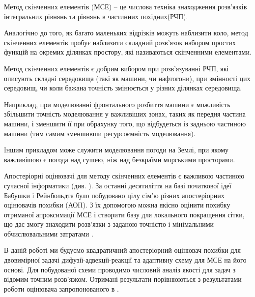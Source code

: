 

Метод скінченних елементів (МСЕ) -- це числова техніка знаходження розв'язків інтегральних рівнянь та рівнянь в частинних похідних(РЧП).

Аналогічно до того, як багато маленьких відрізків можуть наблизити коло, метод скінченних елементів пробує наблизити складний розв'язок набором простих функцій на окремих ділянках простору, які називаються скінченними елементами.

Метод скінченних елементів є добрим вибором при розв'язуванні РЧП, які описують складні середовища (такі як машини, чи нафтогони), при змінності цих середовищ, чи коли бажана точність змінюється у різних ділянках середовища.

Наприклад, при моделюванні фронтального розбиття машини є можливість збільшити точність моделювання у важливіших зонах, таких як передня частина машини, і зменшити її при обрахунку того, що відбудеться із задньою частиною машини (тим самим зменшивши ресурсоємність моделювання).

Іншим прикладом може служити моделювання погоди на Землі, при якому важливішою є погода над сушею, ніж над безкраїми морськими просторами.

Апостеріорні оцінювачі для методу скінченних елементів є важливою частиною сучасної інформатики (див. \cite{verfurth1996review, verfurth1994posteriori,eriksson1995introduction,ainsworth2011posteriori}). За останні десятиліття на базі початкової ідеї Бабушки і Рейнбольдта \cite{babuvska1978posteriori} було побудовано цілу сім'ю різних апостеріорних оцінювачів похибки (АОП). З їх допомогою можна якісно оцінити похибку отриманої апроксимації МСЕ і створити базу для локального покращення сітки, що дає змогу знаходити розв'язки з заданою точністю і мінімальними обчислювальними затратами \cite{babuska2011finite}.

В даній роботі ми будуємо квадратичний апостеріорний оцінювач похибки для двовимірної задачі дифузії-адвекції-реакції та адаптивну схему для МСЕ на його основі. Для побудованої схеми проводимо числовий аналіз якості для задач з відомим точним розв'язком.
Отримані результати порівнюються з результатами роботи оцінювача запропонованого в \cite{OstShynAee11}.
